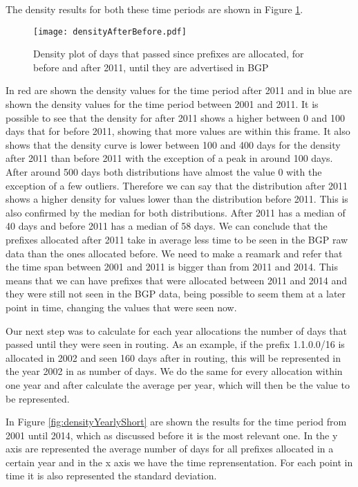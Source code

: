 \documentclass[11pt,a4paper]{scrreprt}
\begin{document}
The density results for both these time periods are shown in Figure \ref{fig:densityAfterBefore2001}.

\begin{figure}[!h]
\centering
\texttt{[image: densityAfterBefore.pdf]}
\caption{Density plot of days that passed since prefixes are allocated, for before and after 2011, until they are advertised in BGP}
\label{fig:densityAfterBefore2001}
\end{figure}

In red are shown the density values for the time period after 2011 and in blue are shown the density values for the time period between 2001 and 2011. It is possible to see that the density for after 2011 shows a higher between 0 and 100 days that for before 2011, showing that more values are within this frame. It also shows that the density curve is lower between 100 and 400 days for the density after 2011 than before 2011 with the exception of a peak in around 100 days. After around 500 days both distributions have almost the value 0 with the exception of a few outliers. Therefore we can say that the distribution after 2011 shows a higher density for values lower than the distribution before 2011. This is also confirmed by the median for both distributions. After 2011 has a median of 40 days and before 2011 has a median of 58 days. 
We can conclude that the prefixes allocated after 2011 take in average less time to be seen in the BGP raw data than the ones allocated before. We need to make a reamark and refer that the time span between 2001 and 2011 is bigger than from 2011 and 2014. This means that we can have prefixes that were allocated between 2011 and 2014 and they were still not seen in the BGP data, being possible to seem them at a later point in time, changing the values that were seen now.

Our next step was to calculate for each year allocations the number of days that passed until they were seen in routing. As an example, if the prefix 1.1.0.0/16 is allocated in 2002 and seen 160 days after in routing, this will be represented in the year 2002 in as number of days. We do the same for every allocation within one year and after calculate the average per year, which will then be the value to be represented.

In  Figure \ref{fig:densityYearlyShort} are shown the results for the time period from 2001 until 2014, which as discussed before it is the most relevant one. In the y axis are represented the average number of days for all prefixes allocated in a certain year and in the x axis we have the time reprensentation. For each point in time it is also represented the standard deviation.
\end{document}
